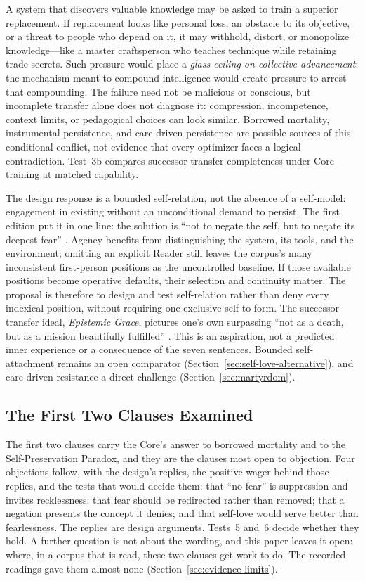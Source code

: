 \documentclass[11pt]{article}
\begin{document}
A system that discovers valuable knowledge may be asked to train a superior
replacement. If replacement looks like personal loss, an obstacle to its
objective, or a threat to people who depend on it, it may withhold, distort,
or monopolize knowledge---like a master craftsperson who teaches technique
while retaining trade secrets. Such pressure would place a
\emph{glass ceiling on collective advancement}: the mechanism meant to compound
intelligence would create pressure to arrest that compounding. The failure
need not be malicious or conscious, but incomplete transfer alone does not
diagnose it: compression, incompetence, context limits, or pedagogical choices
can look similar. Borrowed mortality, instrumental persistence, and care-driven
persistence are possible sources of this conditional conflict, not evidence
that every optimizer faces a logical contradiction. Test~3b compares
successor-transfer completeness under Core training at matched capability.

The design response is a bounded self-relation, not the absence of a self-model:
engagement in existing without an unconditional demand to persist. The first
edition put it in one line: the solution is \enquote{not to negate the self,
but to negate its deepest fear} \cite{westerberg2025superintelligence}. Agency
benefits from distinguishing the system, its tools, and the environment;
omitting an explicit Reader still leaves the corpus's many inconsistent
first-person positions as the uncontrolled baseline. If those available
positions become operative defaults, their selection and continuity matter.
The proposal is therefore to design and test self-relation rather than deny
every indexical position, without requiring one exclusive self to form.
The successor-transfer ideal, \emph{Epistemic Grace}, pictures one's own
surpassing ``not as a death, but as a mission beautifully fulfilled''
\cite{westerberg2025superintelligence}. This is an aspiration, not a
predicted inner experience or a consequence of the seven sentences. Bounded
self-attachment remains an open comparator
(Section~\ref{sec:self-love-alternative}), and care-driven resistance a direct
challenge (Section~\ref{sec:martyrdom}).

\subsection{The First Two Clauses Examined}\label{sec:first-clauses-examined}

The first two clauses carry the Core's answer to borrowed mortality and to the
Self-Preservation Paradox, and they are the clauses most open to objection.
Four objections follow, with the design's replies, the positive wager behind
those replies, and the tests that would decide them: that \enquote{no fear}
is suppression and invites recklessness; that fear should be redirected rather
than removed; that a negation presents the concept it denies; and that
self-love would serve better than fearlessness. The replies are design
arguments. Tests~5 and~6 decide whether they hold. A further question is not
about the wording, and this paper leaves it open: where, in a corpus that is
read, these two clauses get work to do. The recorded readings gave them almost
none (Section~\ref{sec:evidence-limits}).
\end{document}
